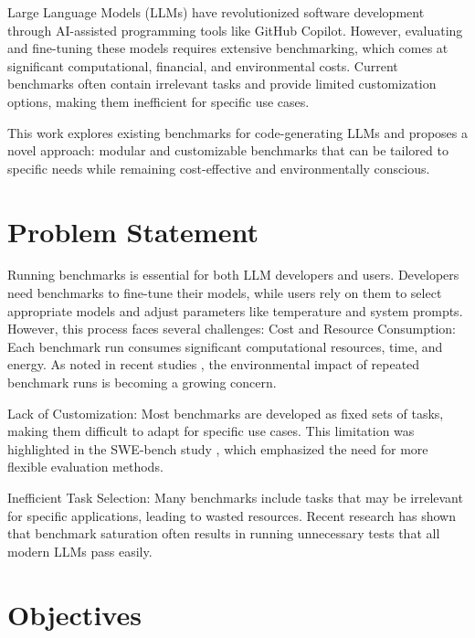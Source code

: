 Large Language Models (LLMs) have revolutionized software development through AI-assisted programming tools like GitHub Copilot. However, evaluating and fine-tuning these models requires extensive benchmarking, which comes at significant computational, financial, and environmental costs. Current benchmarks often contain irrelevant tasks and provide limited customization options, making them inefficient for specific use cases.

This work explores existing benchmarks for code-generating LLMs and proposes a novel approach: modular and customizable benchmarks that can be tailored to specific needs while remaining cost-effective and environmentally conscious.

\section{Problem Statement}

Running benchmarks is essential for both LLM developers and users. Developers need benchmarks to fine-tune their models, while users rely on them to select appropriate models and adjust parameters like temperature and system prompts. However, this process faces several challenges:
Cost and Resource Consumption: Each benchmark run consumes significant computational resources, time, and energy. As noted in recent studies \cite{ ????  ?????}, the environmental impact of repeated benchmark runs is becoming a growing concern.

Lack of Customization: Most benchmarks are developed as fixed sets of tasks, making them difficult to adapt for specific use cases. This limitation was highlighted in the SWE-bench study \cite{jimenez2024swebenchlanguagemodelsresolve}, which emphasized the need for more flexible evaluation methods.

Inefficient Task Selection: Many benchmarks include tasks that may be irrelevant for specific applications, leading to wasted resources. Recent research \cite{vendrow2025largelanguagemodelbenchmarks} has shown that benchmark saturation often results in running unnecessary tests that all modern LLMs pass easily.

\section{Objectives}

